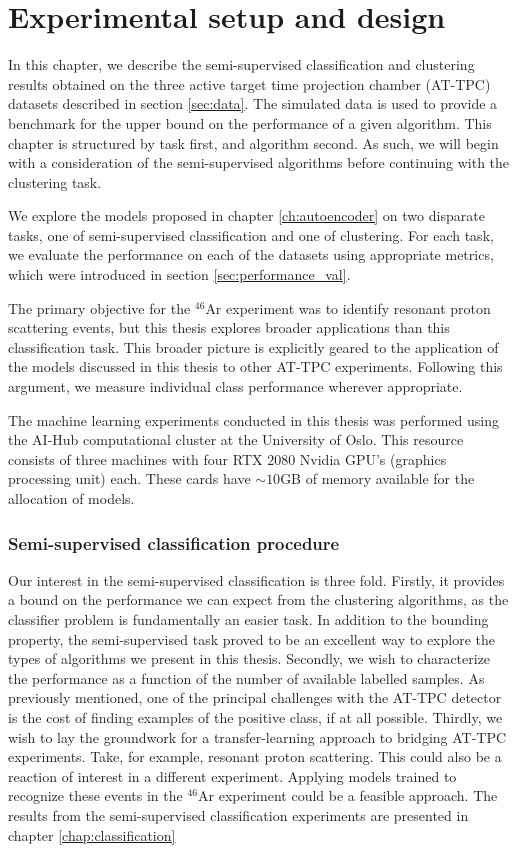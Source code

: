 \chapter{Experimental setup and design}

In this chapter, we describe the semi-supervised classification and clustering results obtained on the three active target time projection chamber (AT-TPC) datasets described in section \ref{sec:data}. The simulated data is used to provide a benchmark for the upper bound on the performance of a given algorithm. This chapter is structured by task first, and algorithm second. As such, we will begin with a consideration of the semi-supervised algorithms before continuing with the clustering task. 

 We explore the models proposed in chapter \ref{ch:autoencoder} on two disparate tasks, one of semi-supervised classification and one of clustering. For each task, we evaluate the performance on each of the datasets using appropriate metrics, which were introduced in section \ref{sec:performance_val}. 

 The primary objective for the ${}^{46}$Ar experiment was to identify resonant proton scattering events, but this thesis explores broader applications than this classification task. This broader picture is explicitly geared to the application of the models discussed in this thesis to other AT-TPC experiments. Following this argument, we measure individual class performance wherever appropriate. 

The machine learning experiments conducted in this thesis was performed using the AI-Hub computational cluster at the University of Oslo.  This resource consists of three machines with four RTX $2080$ Nvidia GPU's (graphics processing unit) each. These cards have $\sim 10$GB of memory available for the allocation of models.

\subsection{Semi-supervised classification procedure}\label{sec:clf_procedure}

Our interest in the semi-supervised classification is three fold. Firstly, it provides a bound on the performance we can expect from the clustering algorithms, as the classifier problem is fundamentally an easier task. In addition to the bounding property, the semi-supervised task proved to be an excellent way to explore the types of algorithms we present in this thesis. Secondly, we wish to characterize the performance as a function of the number of available labelled samples. As previously mentioned, one of the principal challenges with the AT-TPC detector is the cost of finding examples of the positive class, if at all possible. Thirdly, we wish to lay the groundwork for a transfer-learning approach to bridging AT-TPC experiments. Take, for example, resonant proton scattering. This could also be a reaction of interest in a different experiment. Applying models trained to recognize these events in the ${}^{46}$Ar experiment could be a feasible approach. The results from the semi-supervised classification experiments are presented in chapter \ref{chap:classification}


